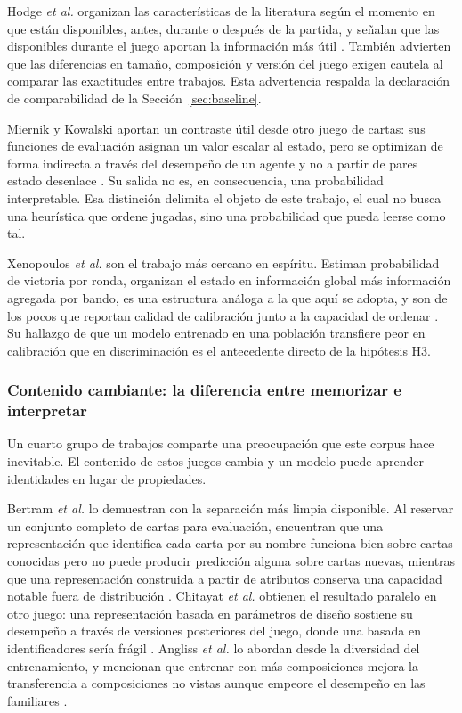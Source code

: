 Hodge \textit{et al.} organizan las características de la literatura según
el momento en que están disponibles, antes, durante o después de la partida,
y señalan que las disponibles durante el juego aportan la información más
útil \cite{hodge_winprediction_2021}. También advierten que las diferencias
en tamaño, composición y versión del juego exigen cautela al comparar las
exactitudes entre trabajos. Esta advertencia respalda la declaración de
comparabilidad de la Sección~\ref{sec:baseline}.

Miernik y Kowalski aportan un contraste útil desde otro juego de cartas: sus
funciones de evaluación asignan un valor escalar al estado, pero se optimizan
de forma indirecta a través del desempeño de un agente y no a partir de
pares estado desenlace \cite{miernik_evolving_2022}. Su salida no es, en
consecuencia, una probabilidad interpretable. Esa distinción delimita el
objeto de este trabajo, el cual no busca una heurística que ordene jugadas, sino
una probabilidad que pueda leerse como tal.

Xenopoulos \textit{et al.} son el trabajo más cercano en espíritu. Estiman
probabilidad de victoria por ronda, organizan el estado en información
global más información agregada por bando, es una estructura análoga a la que
aquí se adopta, y son de los pocos que reportan calidad de calibración
junto a la capacidad de ordenar \cite{xenopoulos_winprob_2022}. Su hallazgo
de que un modelo entrenado en una población transfiere peor en calibración
que en discriminación es el antecedente directo de la hipótesis H3.

\subsubsection{Contenido cambiante: la diferencia entre memorizar e
interpretar}

Un cuarto grupo de trabajos comparte una preocupación que este corpus hace
inevitable. El contenido de estos juegos cambia y un modelo
puede aprender identidades en lugar de propiedades.

Bertram \textit{et al.} lo demuestran con la separación más limpia
disponible. Al reservar un conjunto completo de cartas para evaluación,
encuentran que una representación que identifica cada carta por su nombre
funciona bien sobre cartas conocidas pero no puede producir predicción
alguna sobre cartas nuevas, mientras que una representación construida a
partir de atributos conserva una capacidad notable fuera de distribución
\cite{bertram_cardrepresentations_2024}. Chitayat \textit{et al.} obtienen
el resultado paralelo en otro juego: una representación basada en parámetros
de diseño sostiene su desempeño a través de versiones posteriores del juego,
donde una basada en identificadores sería frágil
\cite{chitayat_meta_2023}. Angliss \textit{et al.} lo abordan desde la
diversidad del entrenamiento, y mencionan que entrenar con más
composiciones mejora la transferencia a composiciones no vistas aunque
empeore el desempeño en las familiares \cite{angliss_vgcbench_2026}.

